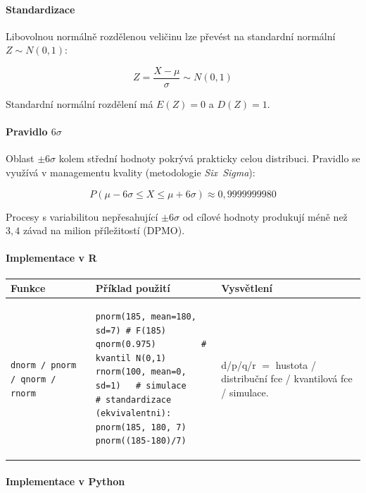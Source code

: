 \documentclass[a4paper, 11pt]{article}
\newenvironment{funkcedict}
{%
  \begingroup
  \renewcommand{\arraystretch}{1.4}%
  \lstset{basicstyle=\ttfamily\small, columns=fullflexible}%
  \setlength{\tabcolsep}{4pt}%
  \begin{tabular}{p{0.19\textwidth} p{0.38\textwidth} p{0.30\textwidth}}
  \textbf{Funkce} & \textbf{Příklad použití} & \textbf{Vysvětlení} \\
  \midrule
}
{%
  \end{tabular}%
  \endgroup
}
\begin{document}
\paragraph{Standardizace}\mbox{}\par

Libovolnou normálně rozdělenou veličinu lze převést na standardní normální
$Z \sim N(0,1)$:

\begin{equation*}
	Z = \frac{X - \mu}{\sigma} \sim N(0,1)
\end{equation*}

Standardní normální rozdělení má $E(Z) = 0$ a $D(Z) = 1$.

\paragraph{Pravidlo $6\sigma$}\mbox{}\par

Oblast $\pm 6\sigma$ kolem střední hodnoty pokrývá prakticky celou distribuci.
Pravidlo se využívá v managementu kvality (metodologie \emph{Six~Sigma}):

\begin{equation*}
	P(\mu - 6\sigma \le X \le \mu + 6\sigma) \approx 0{,}9999999980
\end{equation*}

Procesy s variabilitou nepřesahující $\pm 6\sigma$ od cílové hodnoty produkují
méně než $3{,}4$ závad na milion příležitostí (DPMO).

\paragraph{Implementace v R}\mbox{}\par

\begin{funkcedict}

	\texttt{dnorm / pnorm / qnorm / rnorm} &
	\begin{lstlisting}
pnorm(185, mean=180, sd=7) # F(185)
qnorm(0.975)         # kvantil N(0,1)
rnorm(100, mean=0, sd=1)   # simulace
# standardizace (ekvivalentni):
pnorm(185, 180, 7)
pnorm((185-180)/7)
	\end{lstlisting}
	&
	d/p/q/r $=$ hustota / distribuční fce / kvantilová fce / simulace. \\

\end{funkcedict}

\paragraph{Implementace v Python}\mbox{}\par
\end{document}
